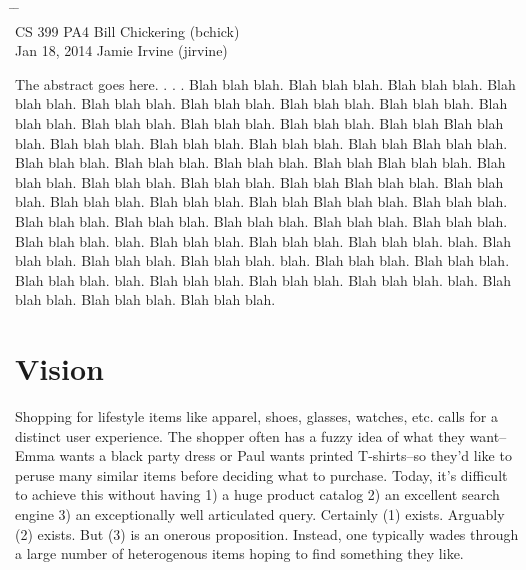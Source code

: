 \documentclass[10pt]{article}
\begin{document}

{\LARGE\bf
\begin{tabbing}
\hspace{2.8in} \= \hspace{1.3in} \= \hspace{1.2in} \= \\

CS 399 \> PA4 \> Bill Chickering (bchick)\\
\normalsize Jan 18, 2014 \> \> Jamie Irvine (jirvine)
\end{tabbing}
}
\vspace{.4in}

The abstract goes here. . . . 
Blah blah blah.  Blah blah blah.  Blah blah blah.  Blah blah blah.  Blah blah
blah.  Blah blah blah.  Blah blah blah.  Blah blah blah.  Blah blah blah.  Blah
blah blah.  Blah blah blah.  Blah blah blah.  Blah blah Blah blah blah.  Blah
blah blah.  Blah blah blah.  Blah blah blah.  Blah blah Blah blah blah.  Blah
blah blah.  Blah blah blah.  Blah blah blah.  Blah blah Blah blah blah.  Blah
blah blah.  Blah blah blah.  Blah blah blah.  Blah blah Blah blah blah.  Blah
blah blah.  Blah blah blah.  Blah blah blah.  Blah blah Blah blah blah.  Blah
blah blah.  Blah blah blah.  Blah blah blah.  Blah blah blah.  Blah blah blah.
Blah blah blah.  Blah blah blah.  blah.  Blah blah blah.  Blah blah blah.  Blah
blah blah.  blah.  Blah blah blah.  Blah blah blah.  Blah blah blah.  blah.
Blah blah blah.  Blah blah blah.  Blah blah blah.  blah.  Blah blah blah.  Blah
blah blah.  Blah blah blah.  blah.  Blah blah blah.  Blah blah blah.  Blah blah
blah.

\section*{Vision}

Shopping for lifestyle items like apparel, shoes, glasses, watches, etc. calls
for a distinct user experience. The shopper often has a fuzzy idea of what they
want--Emma wants a black party dress or Paul wants printed T-shirts--so they'd
like to peruse many similar items before deciding what to purchase. Today, it's
difficult to achieve this without having 1) a huge product catalog 2) an
excellent search engine 3) an exceptionally well articulated query. Certainly
(1) exists. Arguably (2) exists. But (3) is an onerous proposition. Instead,
one typically wades through a large number of heterogenous items hoping to find
something they like.
\end{document}
